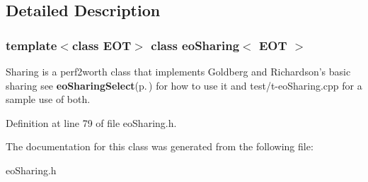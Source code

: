 \subsection{Detailed Description}
\subsubsection*{template$<$class EOT$>$ class eo\-Sharing$<$ EOT $>$}

Sharing is a perf2worth class that implements Goldberg and Richardson's basic sharing see {\bf eo\-Sharing\-Select}{\rm (p.\,\pageref{classeo_sharing_select})} for how to use it and test/t-eo\-Sharing.cpp for a sample use of both. 



Definition at line 79 of file eo\-Sharing.h.

The documentation for this class was generated from the following file:\begin{CompactItemize}
\item 
eo\-Sharing.h\end{CompactItemize}
